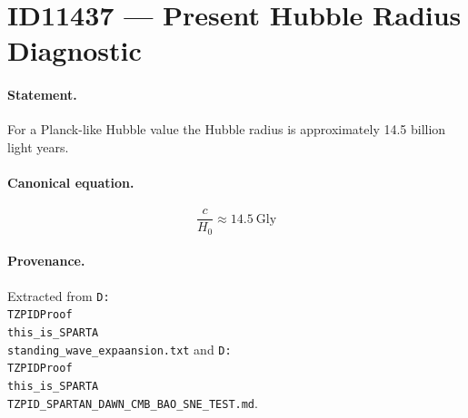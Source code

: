 \section*{ID11437 --- Present Hubble Radius Diagnostic}

\paragraph{Statement.}
For a Planck-like Hubble value the Hubble radius is approximately 14.5 billion light years.

\paragraph{Canonical equation.}
\[
\frac{c}{H_0}\approx14.5\ \mathrm{Gly}
\]

\paragraph{Provenance.}
Extracted from \texttt{D:\\TZPIDProof\\this\_is\_SPARTA\\standing\_wave\_expaansion.txt} and \texttt{D:\\TZPIDProof\\this\_is\_SPARTA\\TZPID\_SPARTAN\_DAWN\_CMB\_BAO\_SNE\_TEST.md}.
